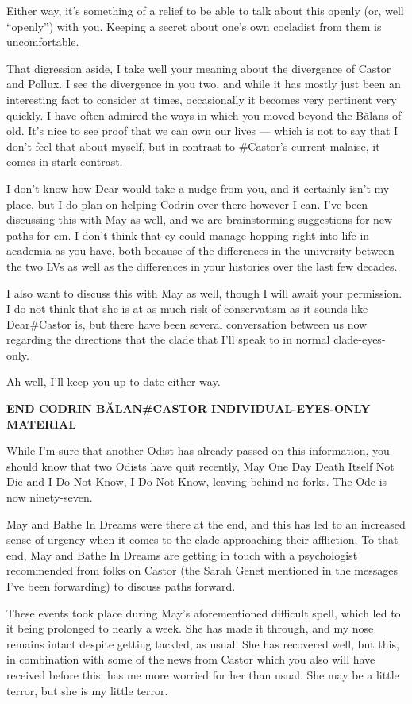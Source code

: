 Either way, it's something of a relief to be able to talk about this openly (or, well ``openly'') with you. Keeping a secret about one's own cocladist from them is uncomfortable.

That digression aside, I take well your meaning about the divergence of Castor and Pollux. I see the divergence in you two, and while it has mostly just been an interesting fact to consider at times, occasionally it becomes very pertinent very quickly. I have often admired the ways in which you moved beyond the Bălans of old. It's nice to see proof that we can own our lives — which is not to say that I don't feel that about myself, but in contrast to \#Castor's current malaise, it comes in stark contrast.

I don't know how Dear would take a nudge from you, and it certainly isn't my place, but I do plan on helping Codrin over there however I can. I've been discussing this with May as well, and we are brainstorming suggestions for new paths for em. I don't think that ey could manage hopping right into life in academia as you have, both because of the differences in the university between the two LVs as well as the differences in your histories over the last few decades.

I also want to discuss this with May as well, though I will await your permission. I do not think that she is at as much risk of conservatism as it sounds like Dear\#Castor is, but there have been several conversation between us now regarding the directions that the clade that I'll speak to in normal clade-eyes-only.

Ah well, I'll keep you up to date either way.

\textbf{END CODRIN BĂLAN\#CASTOR INDIVIDUAL-EYES-ONLY MATERIAL}

While I'm sure that another Odist has already passed on this information, you should know that two Odists have quit recently, May One Day Death Itself Not Die and I Do Not Know, I Do Not Know, leaving behind no forks. The Ode is now ninety-seven.

May and Bathe In Dreams were there at the end, and this has led to an increased sense of urgency when it comes to the clade approaching their affliction. To that end, May and Bathe In Dreams are getting in touch with a psychologist recommended from folks on Castor (the Sarah Genet mentioned in the messages I've been forwarding) to discuss paths forward.

These events took place during May's aforementioned difficult spell, which led to it being prolonged to nearly a week. She has made it through, and my nose remains intact despite getting tackled, as usual. She has recovered well, but this, in combination with some of the news from Castor which you also will have received before this, has me more worried for her than usual. She may be a little terror, but she is my little terror.


